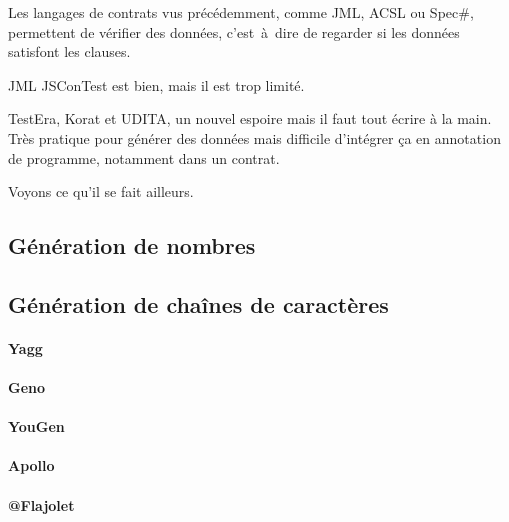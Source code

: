 
Les langages de contrats vus précédemment, comme JML, ACSL ou Spec\#, permettent
de vérifier des données, c'est~à~dire de regarder si les données satisfont les
clauses.

JML 
JSConTest est bien, mais il est trop limité.

TestEra, Korat et UDITA, un nouvel espoire mais il faut tout écrire à la main.
Très pratique pour générer des données mais difficile d'intégrer ça en
annotation de programme, notamment dans un contrat.

Voyons ce qu'il se fait ailleurs.

\subsection{Génération de nombres}

\subsection{Génération de chaînes de caractères}

\paragraph{Yagg}

\paragraph{Geno}

\paragraph{YouGen}

\paragraph{Apollo}

\paragraph{@Flajolet}

